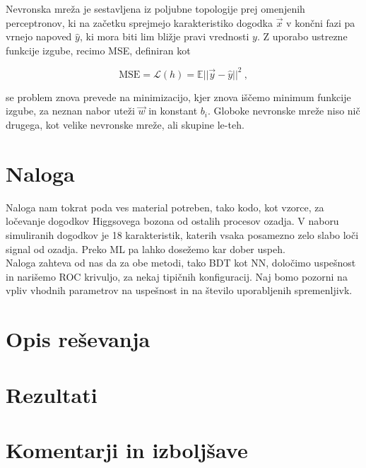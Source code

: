 \documentclass[a4paper]{article}
\begin{document}
Nevronska mreža je sestavljena iz poljubne topologije prej omenjenih perceptronov, ki na začetku sprejmejo karakteristiko 
dogodka $\vec{x}$ v končni fazi pa vrnejo napoved $\hat{y}$, ki mora biti lim bližje pravi vrednosti $y$. Z uporabo ustrezne
funkcije izgube, recimo MSE, definiran kot

\begin{equation}
    \mathrm{MSE} = \mathcal{L}(h) = \mathbb{E}||\vec{y}-\hat{y}||^2\>,
\end{equation}

se problem znova prevede na minimizacijo, kjer znova iščemo minimum funkcije izgube, za neznan nabor uteži $\vec{w}$ in konstant 
$b_i$. Globoke nevronske mreže niso nič drugega, kot velike nevronske mreže, ali skupine le-teh.
\section{Naloga}
Naloga nam tokrat poda ves material potreben, tako kodo, kot vzorce, za ločevanje dogodkov Higgsovega bozona od ostalih procesov
ozadja. V naboru simuliranih dogodkov je 18 karakteristik, katerih vsaka posamezno zelo slabo loči signal od ozadja. Preko ML pa 
lahko dosežemo kar dober uspeh.\\

Naloga zahteva od nas da za obe metodi, tako BDT kot NN, določimo uspešnost in narišemo ROC krivuljo, za nekaj tipičnih konfiguracij.
Naj bomo pozorni na vpliv vhodnih parametrov na uspešnost in na število uporabljenih spremenljivk.

\section{Opis reševanja}

\section{Rezultati}


\section{Komentarji in izboljšave}


\newpage


\end{document}
